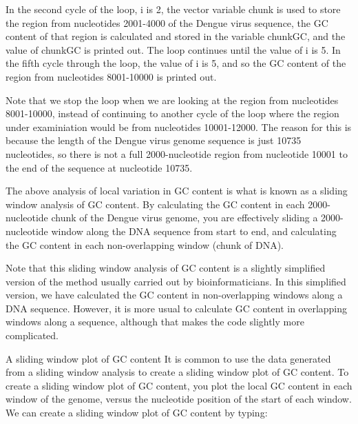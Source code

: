 \documentclass[
]{book}
\begin{document}
In the second cycle of the loop, i is 2, the vector variable chunk is used to store the region from nucleotides 2001-4000 of the Dengue virus sequence, the GC content of that region is calculated and stored in the variable chunkGC, and the value of chunkGC is printed out. The loop continues until the value of i is 5. In the fifth cycle through the loop, the value of i is 5, and so the GC content of the region from nucleotides 8001-10000 is printed out.

Note that we stop the loop when we are looking at the region from nucleotides 8001-10000, instead of continuing to another cycle of the loop where the region under examiniation would be from nucleotides 10001-12000. The reason for this is because the length of the Dengue virus genome sequence is just 10735 nucleotides, so there is not a full 2000-nucleotide region from nucleotide 10001 to the end of the sequence at nucleotide 10735.

The above analysis of local variation in GC content is what is known as a sliding window analysis of GC content. By calculating the GC content in each 2000-nucleotide chunk of the Dengue virus genome, you are effectively sliding a 2000-nucleotide window along the DNA sequence from start to end, and calculating the GC content in each non-overlapping window (chunk of DNA).

Note that this sliding window analysis of GC content is a slightly simplified version of the method usually carried out by bioinformaticians. In this simplified version, we have calculated the GC content in non-overlapping windows along a DNA sequence. However, it is more usual to calculate GC content in overlapping windows along a sequence, although that makes the code slightly more complicated.

A sliding window plot of GC content
It is common to use the data generated from a sliding window analysis to create a sliding window plot of GC content. To create a sliding window plot of GC content, you plot the local GC content in each window of the genome, versus the nucleotide position of the start of each window. We can create a sliding window plot of GC content by typing:
\end{document}
